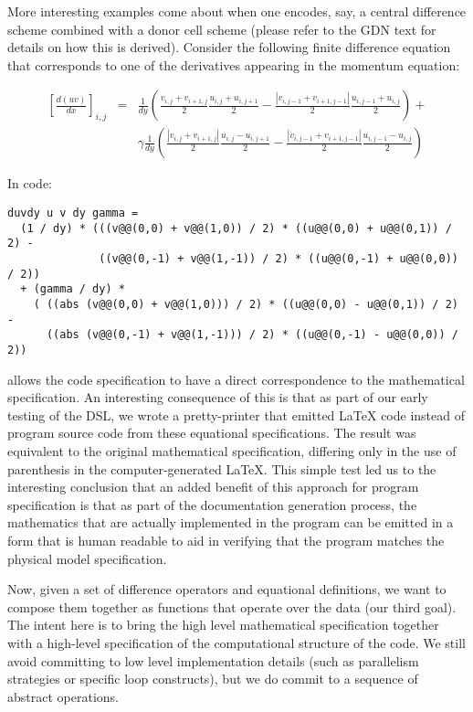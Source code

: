 More interesting examples come about when one encodes, say, a central difference
scheme combined with a donor cell scheme (please refer to the GDN text for
details on how this is derived).  Consider the following finite difference
equation that corresponds to one of the derivatives appearing in the
momentum equation:

\begin{eqnarray}
\left[\frac{d(uv)}{dx}\right]_{i,j} & = & \frac{1}{dy} \left( \frac{v_{i,j} + v_{i+1,j}}{2} \frac{u_{i,j} + u_{i,j+1}}{2} - \frac{|v_{i,j-1} + v_{i+1,j-1}|}{2}\frac{u_{i,j-1} + u_{i,j}}{2}\right) + \nonumber \\
& & \gamma \frac{1}{dy} \left( \frac{|v_{i,j} + v_{i+1,j}|}{2} \frac{u_{i,j} - u_{i,j+1}}{2} - \frac{|v_{i,j-1} + v_{i+1,j-1}|}{2}\frac{u_{i,j-1} - u_{i,j}}{2}\right)
\end{eqnarray}

In code:

\begin{lstlisting}
duvdy u v dy gamma = 
  (1 / dy) * (((v@@(0,0) + v@@(1,0)) / 2) * ((u@@(0,0) + u@@(0,1)) / 2) -
              ((v@@(0,-1) + v@@(1,-1)) / 2) * ((u@@(0,-1) + u@@(0,0)) / 2))
  + (gamma / dy) *
    ( ((abs (v@@(0,0) + v@@(1,0))) / 2) * ((u@@(0,0) - u@@(0,1)) / 2) -
      ((abs (v@@(0,-1) + v@@(1,-1))) / 2) * ((u@@(0,-1) - u@@(0,0)) / 2))
\end{lstlisting}

\FIDDLE allows the code specification to have a direct correspondence to the
mathematical specification.  An interesting consequence of this is that as part
of our early testing of the DSL, we wrote a pretty-printer that emitted
\LaTeX{ } code instead of program source code from these equational specifications.
The result was equivalent to the original mathematical specification, differing
only in the use of parenthesis in the computer-generated \LaTeX.  This simple
test led us to the interesting conclusion that an added benefit of this approach
for program specification is that as part of the documentation generation
process, the mathematics that are actually implemented in the program can
be emitted in a form that is human readable to aid in verifying that the program
matches the physical model specification.

Now, given a set of difference operators and equational definitions, we want to
compose them together as functions that operate over the data (our third goal).
The intent here is to bring the high level mathematical specification together with
a high-level specification of the computational structure of the code.  We still
avoid committing to low level implementation details (such as parallelism strategies
or specific loop constructs), but we do commit to a sequence of abstract operations.


